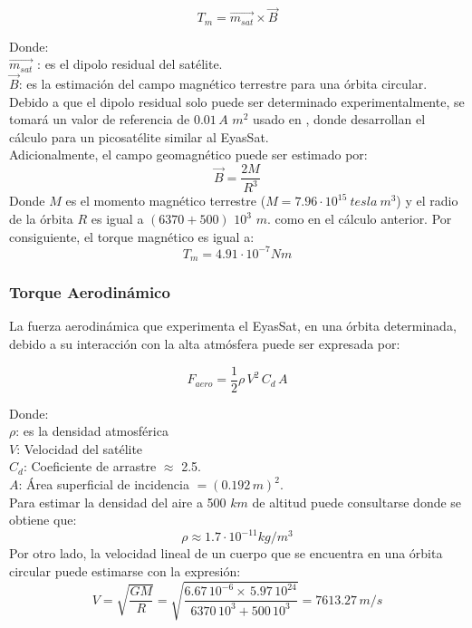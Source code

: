 \begin{equation}
	T_m = \vec{m_{sat}}\times\vec{B}\label{eq:torque_mag}	
\end{equation}


\noindent Donde:\\
$\vec{m_{sat}}$ : es el dipolo residual del satélite.\\
$\vec{B}$: es la estimación del campo magnético terrestre para una órbita circular.\\

Debido a que el dipolo residual solo puede ser determinado experimentalmente, se tomará un valor de referencia de $0.01\,A $ $m^2$ usado en \cite{Giesselman2006}, donde desarrollan el cálculo  para un picosatélite similar al EyasSat.\\
Adicionalmente, el campo geomagnético puede ser estimado por:
\begin{equation}
	\vec{B} = \frac{2M}{R^3}\label{eq:campoMagnetico}
\end{equation}
Donde $M$ es el momento magnético terrestre ($M = 7.96\cdot10^{15}\:tesla\:m^3$) y el radio de la órbita $R$ es igual a $(6370 + 500)$ $10^3$ $m$. como en el cálculo anterior. Por consiguiente, el torque magnético es igual a:
$$T_m = 4.91\cdot10^{-7} Nm$$
	

\subsubsection{Torque Aerodinámico}
\hfill \break
La fuerza aerodinámica que experimenta el EyasSat, en una órbita determinada, debido a su interacción con la alta atmósfera puede ser expresada por:

\begin{equation}\label{eq:fuerza_aero}
	F_{aero} = \frac{1}{2}\rho\,V^2\,C_{d}\,A
\end{equation}

\noindent Donde:\\
$\rho$: es la densidad atmosférica\\
$V$: Velocidad del satélite \\
$C_d$: Coeficiente de arrastre $\approx$ 2.5.\\
$A$: Área superficial de incidencia $= \left(0.192\,m\right)^2$.\\
Para estimar la densidad del aire a 500 $km$ de altitud puede consultarse \cite{wertz2001mission} donde se obtiene que:
 $$\rho \approx 1.7\cdot10^{-11} kg/m^3$$
 Por otro lado, la velocidad lineal de un cuerpo que se encuentra en una órbita circular puede estimarse con la expresión:
 $$ V = \sqrt{\frac{GM}{R}} = \sqrt{\frac{6.67\,10^{-6}\times\,5.97\,10^{24}}{6370\,10^3 +500\,10^3}} =7613.27\,m/s $$

